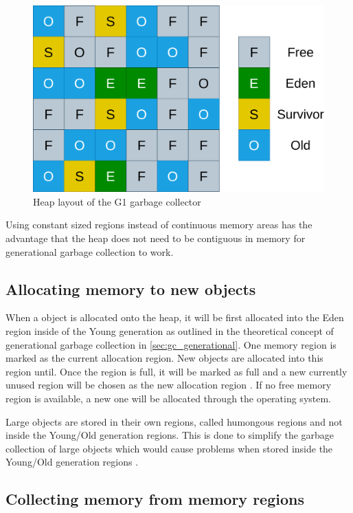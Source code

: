 \begin{figure}[htbp]
    \centering
    \includegraphics[width=.7\textwidth]{images/G1_Heap_Layout.drawio.png}
    \caption{Heap layout of the G1 garbage collector}
    \label{fig:g1_heap_layout}
\end{figure}

Using constant sized regions instead of continuous memory areas has the advantage
that the heap does not need to be contiguous in memory for generational garbage collection to work.

\subsection{Allocating memory to new objects}

When a object is allocated onto the heap, it will be first allocated into the
Eden region inside of the Young generation as outlined in the theoretical concept
of generational garbage collection in \autoref{sec:gc_generational}.
One memory region is marked as the current allocation region.
New objects are allocated into this region until.
Once the region is full, it will be marked as full and a new currently unused region will be
chosen as the new allocation region \cite[2.1 Allocation]{java_g1_2004}.
If no free memory region is available, a new one will be allocated through the operating system.

Large objects are stored in their own regions, called humongous regions
and not inside the Young/Old generation regions.
This is done to simplify the garbage collection of large objects which
would cause problems when stored inside the Young/Old generation regions \cite[2.1 Heap Layout]{java_g1_2004}.

\subsection{Collecting memory from memory regions}

